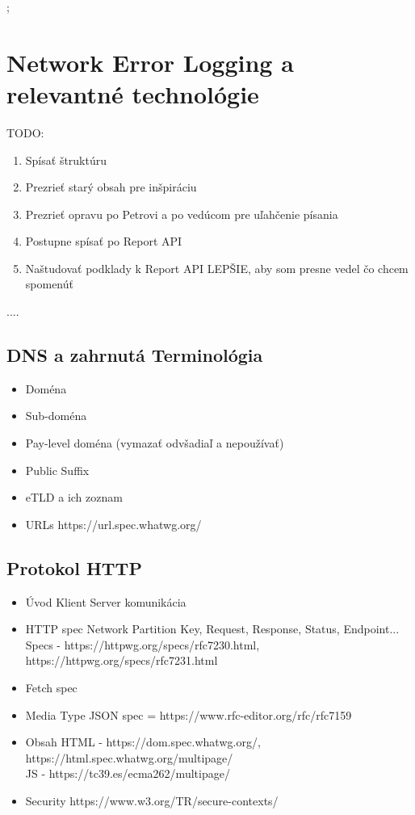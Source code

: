 ;\chapter{Network Error Logging a relevantné technológie}
\label{nel-and-related-technologies}

TODO:
\begin{enumerate}
    \item Spísať štruktúru
    \item Prezrieť starý obsah pre inšpiráciu
    \item Prezrieť opravu po Petrovi a po vedúcom pre uľahčenie písania
    \item Postupne spísať po Report API
    \item Naštudovať podklady k Report API LEPŠIE, aby som presne vedel čo chcem spomenúť
\end{enumerate}


....


\section{DNS a zahrnutá Terminológia}
\begin{itemize}
    \item Doména
    \item Sub-doména
    \item Pay-level doména (vymazať odvšadiaľ a nepoužívať)
    \item Public Suffix
    \item eTLD a ich zoznam
    \item URLs
    https://url.spec.whatwg.org/
\end{itemize}

\section{Protokol HTTP}
\begin{itemize}
    \item Úvod 
    Klient Server komunikácia
    \item HTTP spec
    Network Partition Key, Request, Response, Status, Endpoint...
    \\
    Specs - https://httpwg.org/specs/rfc7230.html, https://httpwg.org/specs/rfc7231.html
    \item Fetch spec
    \item Media Type
    JSON spec = https://www.rfc-editor.org/rfc/rfc7159
    \item Obsah
    HTML - https://dom.spec.whatwg.org/, https://html.spec.whatwg.org/multipage/ 
    \\
    JS - https://tc39.es/ecma262/multipage/
    \item Security
    https://www.w3.org/TR/secure-contexts/
\end{itemize}

